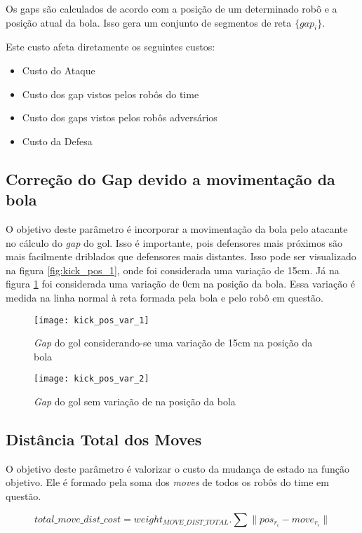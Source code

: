 Os gaps são calculados de acordo com a posição de um determinado robô
e a posição atual da bola. Isso gera um conjunto de segmentos de reta
$\lbrace gap_i \rbrace$.

Este custo afeta diretamente os seguintes custos:
\begin{itemize}
  \item Custo do Ataque
  \item Custo dos gap vistos pelos robôs do time
  \item Custo dos gaps vistos pelos robôs adversários
  \item Custo da Defesa
\end{itemize}

\subsection{Correção do Gap devido a movimentação da bola} 
O objetivo deste parâmetro é incorporar a movimentação
da bola pelo atacante no cálculo do \textit{gap} do gol. Isso é importante,
pois defensores mais
próximos são mais facilmente driblados que defensores mais distantes. Isso
pode ser visualizado na figura \ref{fig:kick_pos_1}, onde foi considerada
uma variação de 15cm. Já na figura \ref{fig:kick_pos_2} foi considerada uma
variação de 0cm na posição da bola. Essa variação é medida na linha normal
à reta formada pela bola e pelo robô em questão.


\begin{figure}[h]
  \centering
  \texttt{[image: kick\_pos\_var\_1]}
  \caption{\textit{Gap} do gol considerando-se uma variação de 15cm na 
           posição da bola}\label{fig:kick_pos_1}
  \texttt{[image: kick\_pos\_var\_2]}
  \caption{\textit{Gap} do gol sem variação de na posição da
           bola}\label{fig:kick_pos_2}
\end{figure}


\subsection{Distância Total dos Moves} 
O objetivo deste parâmetro é valorizar o custo da
mudança de estado na função objetivo. Ele é formado pela soma dos
\textit{moves} de todos os robôs do time em questão.

\begin{dmath} 
 total{\_}move{\_}dist{\_}cost = weight_{MOVE{\_}DIST{\_}TOTAL} . 
 \sum \lVert pos_{r_i} - move_{r_i}\rVert
\end{dmath} 

